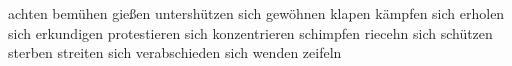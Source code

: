 \documentclass[10pt,a4paper]{revtex4-2}
\begin{document}
achten
bemühen
gießen
untershützen
sich gewöhnen
klapen
kämpfen
sich erholen
sich erkundigen
protestieren
sich konzentrieren
schimpfen
riecehn
sich schützen
sterben
streiten 
sich verabschieden
sich wenden
zeifeln
\end{document}
